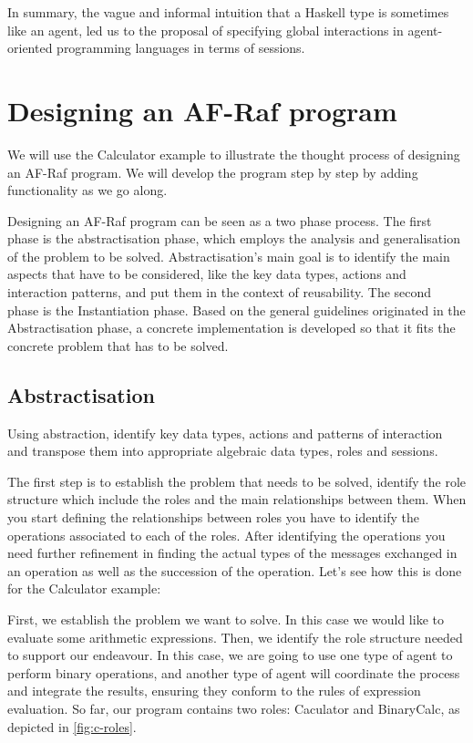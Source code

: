 \documentclass[a4paper,12pt,oneside,fleqn]{book} %
\newcommand{\todo}[1]{[\textcolor{red}{TODO}: #1]}
\begin{document}
In summary, the vague and informal intuition that a Haskell type is
sometimes like an agent, led us to the proposal of specifying global
interactions in agent-oriented programming languages in terms of sessions.

\section{Designing an AF-Raf program} %
We will use the Calculator example to illustrate the thought process of
designing an AF-Raf program. We will develop the program step by step by
adding functionality as we go along.

Designing an AF-Raf program can be seen as a two phase process. The first
phase is the abstractisation phase, which employs the analysis and
generalisation of the problem to be solved. Abstractisation's main goal is to
identify the main aspects that have to be considered, like the key data
types, actions and interaction patterns, and put them in the context of
reusability. The second phase is the Instantiation phase. Based on the
general guidelines originated in the Abstractisation phase, a concrete
implementation is developed so that it fits the concrete problem that has
to be solved.
\subsection{Abstractisation} %
Using abstraction, identify key data types, actions and patterns of
interaction and transpose them into appropriate algebraic data types, roles
and sessions.

The first step is to establish the problem that needs to be solved, identify
the role structure which include the roles and the main relationships
between them. When you start defining the relationships between roles you
have to identify the operations associated to each of the roles. After
identifying the operations you need further refinement in finding the
actual types of the messages exchanged in an operation as well as the
succession of the operation. Let's see how this is done for the Calculator
example:

First, we establish the problem we want to solve. In this case we would
like to evaluate some arithmetic expressions. Then, we identify the role
structure needed to support our endeavour. In this case, we are going to
use one type of agent to perform binary operations, and another type of
agent will coordinate the process and integrate the results, ensuring they
conform to the rules of expression evaluation. So far, our program contains
two roles: Caculator and BinaryCalc, as depicted in \autoref{fig:c-roles}.
\end{document}
